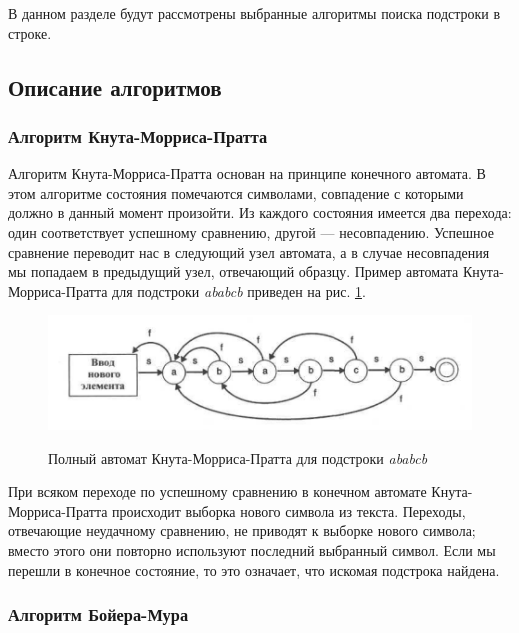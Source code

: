 \documentclass[a4paper,12pt]{article}
\begin{document}
В данном разделе будут рассмотрены выбранные алгоритмы поиска подстроки в строке.
	
\subsection{Описание алгоритмов}

\subsubsection{Алгоритм Кнута-Морриса-Пратта}

Алгоритм Кнута-Морриса-Пратта основан на принципе конечного автомата.
В этом алгоритме состояния помечаются символами, совпадение с которыми должно в данный момент произойти.
Из каждого состояния имеется два перехода: один соответствует успешному сравнению, другой — несовпадению.
Успешное сравнение переводит нас в следующий узел автомата, а в случае несовпадения мы попадаем
в предыдущий узел, отвечающий образцу.
Пример автомата Кнута-Морриса-Пратта для подстроки \textit{ababcb} приведен на рис. \ref{fig:kmp_example}. ~\cite{mcconell}

\begin{figure}[h!]
\begin{center}
{\includegraphics[scale = 0.5]{img/kmp_example.png}}
\caption{
Полный автомат Кнута-Морриса-Пратта для подстроки \textit{ababcb}}
\label{fig:kmp_example}
\end{center}
\end{figure}

При всяком переходе по успешному сравнению в конечном автомате
Кнута-Морриса-Пратта происходит выборка нового символа из текста.
Переходы, отвечающие неудачному сравнению, не приводят к выборке нового символа;
вместо этого они повторно используют последний выбранный символ. Если мы перешли в конечное состояние,
то это означает, что искомая подстрока найдена.

\subsubsection{Алгоритм Бойера-Мура}
\end{document}

